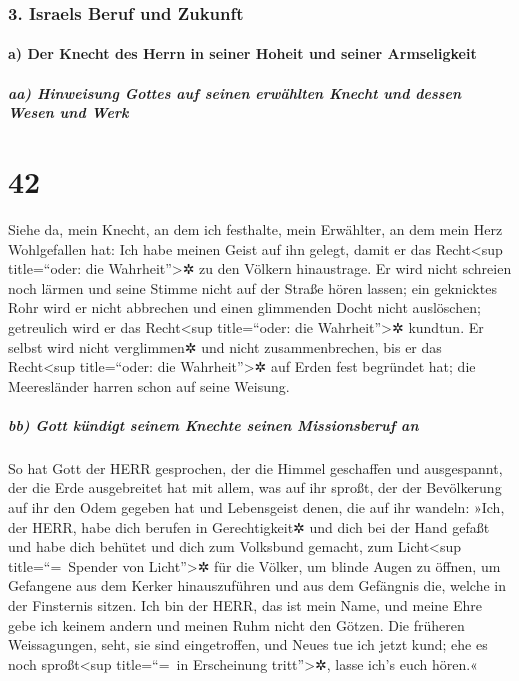 \hypertarget{israels-beruf-und-zukunft}{%
\subsubsection{3. Israels Beruf und
Zukunft}\label{israels-beruf-und-zukunft}}

\hypertarget{a-der-knecht-des-herrn-in-seiner-hoheit-und-seiner-armseligkeit}{%
\paragraph{a) Der Knecht des Herrn in seiner Hoheit und seiner
Armseligkeit}\label{a-der-knecht-des-herrn-in-seiner-hoheit-und-seiner-armseligkeit}}

\hypertarget{aa-hinweisung-gottes-auf-seinen-erwuxe4hlten-knecht-und-dessen-wesen-und-werk}{%
\subparagraph{aa) Hinweisung Gottes auf seinen erwählten Knecht und
dessen Wesen und
Werk}\label{aa-hinweisung-gottes-auf-seinen-erwuxe4hlten-knecht-und-dessen-wesen-und-werk}}

\hypertarget{section-41}{%
\section{42}\label{section-41}}

Siehe da, mein Knecht, an dem ich festhalte, mein
Erwählter, an dem mein Herz Wohlgefallen hat: Ich habe meinen Geist auf
ihn gelegt, damit er das Recht\textless sup title=``oder: die
Wahrheit''\textgreater✲ zu den Völkern hinaustrage. Er
wird nicht schreien noch lärmen und seine Stimme nicht auf der Straße
hören lassen; ein geknicktes Rohr wird er nicht abbrechen
und einen glimmenden Docht nicht auslöschen; getreulich wird er das
Recht\textless sup title=``oder: die Wahrheit''\textgreater✲ kundtun.
Er selbst wird nicht verglimmen✲ und nicht
zusammenbrechen, bis er das Recht\textless sup title=``oder: die
Wahrheit''\textgreater✲ auf Erden fest begründet hat; die Meeresländer
harren schon auf seine Weisung.

\hypertarget{bb-gott-kuxfcndigt-seinem-knechte-seinen-missionsberuf-an}{%
\subparagraph{bb) Gott kündigt seinem Knechte seinen Missionsberuf
an}\label{bb-gott-kuxfcndigt-seinem-knechte-seinen-missionsberuf-an}}

So hat Gott der HERR gesprochen, der die Himmel geschaffen
und ausgespannt, der die Erde ausgebreitet hat mit allem, was auf ihr
sproßt, der der Bevölkerung auf ihr den Odem gegeben hat und Lebensgeist
denen, die auf ihr wandeln: »Ich, der HERR, habe dich
berufen in Gerechtigkeit✲ und dich bei der Hand gefaßt und habe dich
behütet und dich zum Volksbund gemacht, zum Licht\textless sup
title=``=~Spender von Licht''\textgreater✲ für die Völker,
um blinde Augen zu öffnen, um Gefangene aus dem Kerker
hinauszuführen und aus dem Gefängnis die, welche in der Finsternis
sitzen. Ich bin der HERR, das ist mein Name, und meine
Ehre gebe ich keinem andern und meinen Ruhm nicht den Götzen.
Die früheren Weissagungen, seht, sie sind eingetroffen,
und Neues tue ich jetzt kund; ehe es noch sproßt\textless sup
title=``=~in Erscheinung tritt''\textgreater✲, lasse ich's euch hören.«

